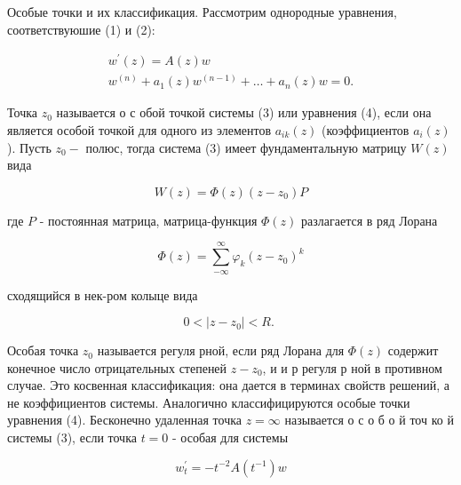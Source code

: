 \documentclass[10pt]{article}
\begin{document}
Особые точки и их классификация. Рассмотрим однородные уравнения, соответствуюшие (1) и (2):



\[

\begin{gathered}

w^{\prime}(z)=A(z) w \\

w^{(n)}+a_{1}(z) w^{(n-1)}+\ldots+a_{n}(z) w=0 .

\end{gathered}

\]



Точка $z_{0}$ называется о с обой точкой системы (3) или уравнения (4), если она является особой точкой для одного из элементов $a_{i k}(z)$ (коэффициентов $a_{i}(z)$ ). Пусть $z_{0}-$ полюс, тогда система (3) имеет фундаментальную матрицу $W(z)$ вида



\[

W(z)=\Phi(z)\left(z-z_{0}\right) P

\]



где $P$ - постоянная матрица, матрица-функция $\Phi(z)$ разлагается в ряд Лорана



\[

\Phi(z)=\sum_{-\infty}^{\infty} \varphi_{k}\left(z-z_{0}\right)^{k}

\]



сходящийся в нек-ром колыце вида



\[

0<\left|z-z_{0}\right|<R \text {. }

\]



Особая точка $z_{0}$ называется регуля рной, если ряд Лорана для $\Phi(z)$ содержит конечное число отрицательных степеней $z-z_{0}$, и и р регуля р ной в противном случае. Это косвенная классификация: она дается в терминах свойств решений, а не коэффициентов системы. Аналогично классифицируются особые точки уравнения (4). Бесконечно удаленная точка $z=\infty$ называется о с о б о й точ ко й системы (3), если точка $t=0$ - особая для системы



\[

w_{t}^{\prime}=-t^{-2} A\left(t^{-1}\right) w

\]
\end{document}
